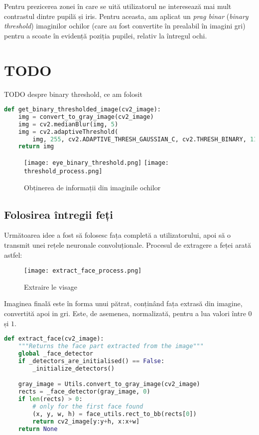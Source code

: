 Pentru prezicerea zonei în care se uită utilizatorul ne interesează mai mult contrastul dintre pupilă și iris.
Pentru aceasta, am aplicat un \emph{prag binar} (\emph{binary threshold}) imaginilor ochilor (care au fost convertite în prealabil în imagini gri) pentru a scoate în evidență poziția pupilei, relativ la întregul ochi.

\section{TODO}
TODO despre binary threshold, ce am folosit

\begin{lstlisting}[language=Python, caption=Aplicarea unui \emph{binary threshold}]
def get_binary_thresholded_image(cv2_image):
    img = convert_to_gray_image(cv2_image)
    img = cv2.medianBlur(img, 5)
    img = cv2.adaptiveThreshold(
        img, 255, cv2.ADAPTIVE_THRESH_GAUSSIAN_C, cv2.THRESH_BINARY, 11, 2)
    return img
\end{lstlisting}

\begin{figure}[h]
    \centering
    \texttt{[image: eye\_binary\_threshold.png]}
    \texttt{[image: threshold\_process.png]}
    \caption{Obținerea de informații din imaginile ochilor}
\end{figure}

\subsection{Folosirea întregii feți}
Următoarea idee a fost să folosesc fața completă a utilizatorului, apoi să o transmit unei rețele neuronale convoluționale.
Procesul de extragere a feței arată astfel:

\begin{figure}[h]
    \centering
    \texttt{[image: extract\_face\_process.png]}
    \caption{Extraire le visage}
    \label{fig_extracted_faces}
\end{figure}

Imaginea finală este în forma unui pătrat, conținând fața extrasă din imagine, convertită apoi in gri.
Este, de asemenea, normalizată, pentru a lua valori între $0$ și $1$.

\begin{lstlisting}[language=Python, caption=Extragerea feței dintr-o imagine]
def extract_face(cv2_image):
    """Returns the face part extracted from the image"""
    global _face_detector
    if _detectors_are_initialised() == False:
        _initialize_detectors()

    gray_image = Utils.convert_to_gray_image(cv2_image)
    rects = _face_detector(gray_image, 0)
    if len(rects) > 0:
        # only for the first face found
        (x, y, w, h) = face_utils.rect_to_bb(rects[0])
        return cv2_image[y:y+h, x:x+w]
    return None
\end{lstlisting}

